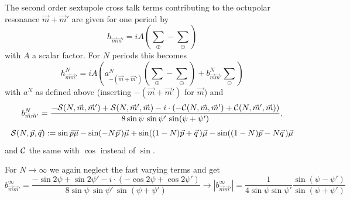 \documentclass[12pt]{article}
\newcommand\beq{\begin{equation}}
\newcommand\eeq{\end{equation}}
\begin{document}
The second order sextupole cross talk terms contributing to the octupolar resonance $\vec{m}+\vec{m}'$
are given for one period by
\beq
h_{\vec{m}\vec{m}'}=iA \left( \sum_{\oplus}-\sum_{\ominus} \right)
\eeq
with $A$ a scalar factor\cite{jbsls}. For $N$ periods this becomes
\beq
h_{\vec{m}\vec{m}'}^N=iA \left( a^N_{-(\vec{m}+\vec{m}')} \left( \sum_{\oplus}-\sum_{\ominus}\right)
+b^N_{\vec{m}\vec{m}'}\sum_{\odot}\right)
\eeq
with $a^N$ as defined above (inserting $-(\vec{m}+\vec{m}')$ for $\vec{m}$) and
\beq
b^N_{\vec{m}\vec{m}'}=\frac{-{\cal S}(N,\vec{m},\vec{m}')+{\cal S}(N,\vec{m}',\vec{m}) -i\cdot
\left(-{\cal C}(N,\vec{m},\vec{m}')+{\cal C}(N,\vec{m}',\vec{m})  \right)}
{8 \sin \psi\, \sin\psi'\,  \sin(\psi+\psi')} ,
\eeq
\beq
{\cal S}(N,\vec{p},\vec{q}):=\sin\vec{p}\vec{\mu}-\sin (-N\vec{p}\,)\vec{\mu}
+\sin ((1-N)\vec{p}+\vec{q}\,)\vec{\mu}-\sin ((1-N)\vec{p}-N\vec{q}\,)\vec{\mu}
\eeq
and ${\cal C}$ the same with $\cos$ instead of $\sin$.

For $N\rightarrow\infty$ we again neglect the fast varying terms and get
\beq
b^{\infty}_{\vec{m}\vec{m}'}=\frac
{-\sin 2\psi+ \sin 2\psi' -i\cdot\left(-\cos 2\psi+ \cos 2\psi' \right)}
{8 \sin \psi\, \sin\psi'\,  \sin(\psi+\psi')} \rightarrow
\left| b^{\infty}_{\vec{m}\vec{m}'}  \right| = \frac{1}{4\sin\psi\sin\psi'}
\frac{\sin(\psi-\psi')}{\sin(\psi+\psi')}
\eeq
\end{document}
